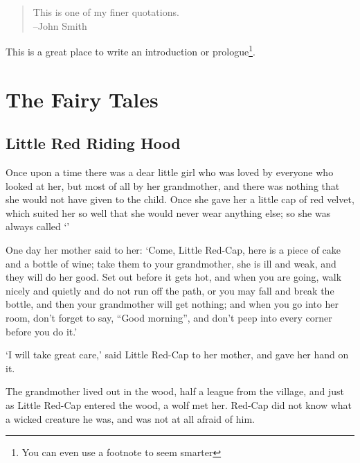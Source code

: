 \documentclass[oneside,11pt]{memoir} %
\begin{document}
	\begin{quote}
		This is one of my finer quotations.\\
		--John Smith
	\end{quote}
	
	This is a great place to write an introduction or prologue\footnote{You can even use a footnote to seem smarter}.
	
	
	\part{The Fairy Tales}
	
	
	\chapter{Little Red Riding Hood}
	
	Once upon a time there was a dear little girl who was loved by everyone who looked at her, but most of all by her grandmother, and there was nothing that she would not have given to the child. Once she gave her a little cap of red velvet, which suited her so well that she would never wear anything else; so she was always called `'
	
	One day her mother said to her: `Come, Little Red-Cap, here is a piece of cake and a bottle of wine; take them to your grandmother, she is ill and weak, and they will do her good. Set out before it gets hot, and when you are going, walk nicely and quietly and do not run off the path, or you may fall and break the bottle, and then your grandmother will get nothing; and when you go into her room, don't forget to say, ``Good morning'', and don't peep into every corner before you do it.'
	
	`I will take great care,' said Little Red-Cap to her mother, and gave her hand on it.
	
	The grandmother lived out in the wood, half a league from the village, and just as Little Red-Cap entered the wood, a wolf met her. Red-Cap did not know what a wicked creature he was, and was not at all afraid of him.
	
\end{document}
